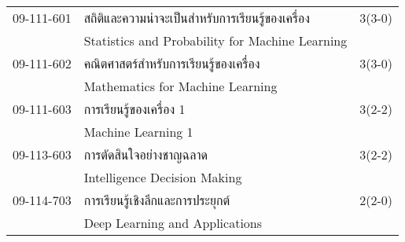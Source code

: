 \begin{longtable}{p{}p{}r{}}
09-111-601 & สถิติและความน่าจะเป็นสำหรับการเรียนรู้ของเครื่อง & 3(3-0)\\
& Statistics and Probability for Machine Learning & \\[3mm]
09-111-602 & คณิตศาสตร์สำหรับการเรียนรู้ของเครื่อง & 3(3-0)\\
& Mathematics for Machine Learning & \\[3mm]
09-111-603 & การเรียนรู้ของเครื่อง 1 & 3(2-2)\\
& Machine Learning 1 & \\[3mm]
09-113-603 & การตัดสินใจอย่างชาญฉลาด & 3(2-2)\\
& Intelligence Decision Making & \\[3mm]
09-114-703 & การเรียนรู้เชิงลึกและการประยุกต์   & 2(2-0)\\
& Deep Learning and Applications & \\[3mm]
\end{longtable}
